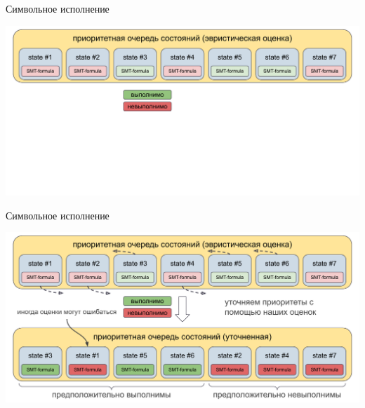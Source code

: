 \documentclass[14pt,aspectratio=169,hyperref={pdftex,unicode},xcolor=dvipsnames]{beamer}
\begin{document}
\begin{frame}{Символьное исполнение}

\begin{center}
  \includegraphics[scale=0.53]{./assets/symbex-ranking-1.pdf}
\end{center}

\end{frame}



\begin{frame}[noframenumbering]{Символьное исполнение}

\begin{center}
  \includegraphics[scale=0.53]{./assets/symbex-ranking-2.pdf}
\end{center}

\end{frame}
\end{document}
